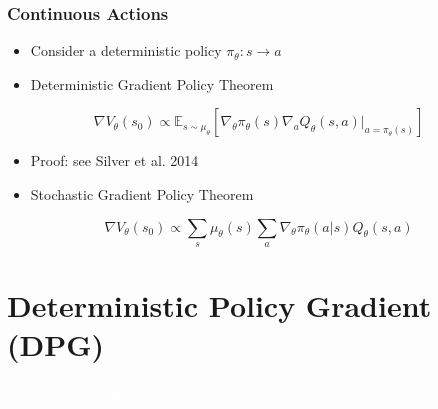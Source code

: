 \documentclass[11pt,table]{beamer}
\begin{document}
\begin{frame}
\frametitle{Continuous Actions}

\begin{itemize}
    \item Consider a deterministic policy \( \pi_\theta: s \rightarrow a \)
\end{itemize}

\vspace{0.5em}

\begin{itemize}
    \item Deterministic Gradient Policy Theorem
\end{itemize}

\[
\nabla V_\theta(s_0) \propto \mathbb{E}_{s \sim \mu_\theta} \left[ \nabla_\theta \pi_\theta(s) \nabla_a Q_\theta(s, a) \big|_{a=\pi_\theta(s)} \right]
\]

\begin{itemize}
    \item Proof: see Silver et al. 2014
\end{itemize}

\vspace{0.5em}

\begin{itemize}
    \item Stochastic Gradient Policy Theorem
\end{itemize}

\[
\nabla V_\theta(s_0) \propto \sum_s \mu_\theta(s) \sum_a \nabla_\theta \pi_\theta(a|s) Q_\theta(s,a)
\]

\end{frame}



\section{Deterministic Policy Gradient (DPG)}
{
\begin{frame}
\centering
\Huge
\textcolor{white}{Deterministic Policy Gradient (DPG)}
\thispagestyle{empty}
\end{frame}
}
\end{document}

